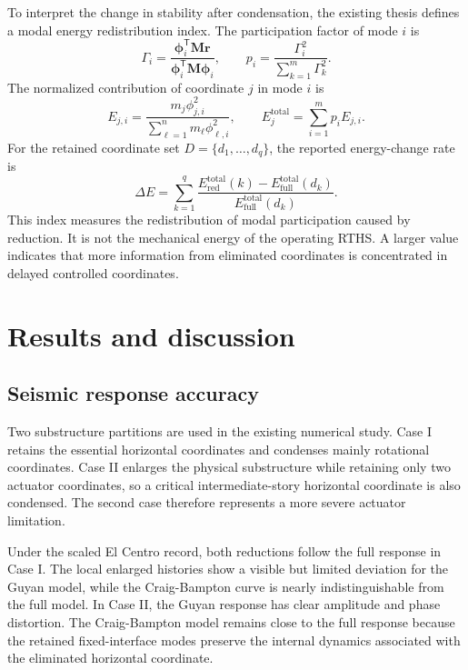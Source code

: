 \documentclass[11pt,a4paper]{article}
\newenvironment{addedblock}{\begingroup\color{addedred}}{\endgroup}
\begin{document}
\begin{addedblock}
To interpret the change in stability after condensation, the existing thesis defines a modal energy redistribution index. The participation factor of mode $i$ is
\begin{equation}
\Gamma_i=\frac{\bm\phi_i^{\mathsf T}\bm M\bm r}{\bm\phi_i^{\mathsf T}\bm M\bm\phi_i},
\qquad
p_i=\frac{\Gamma_i^2}{\sum_{k=1}^{m}\Gamma_k^2}.
\end{equation}
The normalized contribution of coordinate $j$ in mode $i$ is
\begin{equation}
E_{j,i}=\frac{m_j\phi_{j,i}^2}{\sum_{\ell=1}^{n}m_{\ell}\phi_{\ell,i}^2},
\qquad
E_j^{\mathrm{total}}=\sum_{i=1}^{m}p_iE_{j,i}.
\end{equation}
For the retained coordinate set $D=\{d_1,\ldots,d_q\}$, the reported energy-change rate is
\begin{equation}
\Delta E=\sum_{k=1}^{q}\frac{E_{\mathrm{red}}^{\mathrm{total}}(k)-E_{\mathrm{full}}^{\mathrm{total}}(d_k)}{E_{\mathrm{full}}^{\mathrm{total}}(d_k)}.
\label{eq:energyindex}
\end{equation}
This index measures the redistribution of modal participation caused by reduction. It is not the mechanical energy of the operating RTHS. A larger value indicates that more information from eliminated coordinates is concentrated in delayed controlled coordinates.
\end{addedblock}

\FloatBarrier
\section{Results and discussion}

\subsection{Seismic response accuracy}

Two substructure partitions are used in the existing numerical study. Case I retains the essential horizontal coordinates and condenses mainly rotational coordinates. Case II enlarges the physical substructure while retaining only two actuator coordinates, so a critical intermediate-story horizontal coordinate is also condensed. The second case therefore represents a more severe actuator limitation.

Under the scaled El Centro record, both reductions follow the full response in Case I. The local enlarged histories show a visible but limited deviation for the Guyan model, while the Craig-Bampton curve is nearly indistinguishable from the full model. In Case II, the Guyan response has clear amplitude and phase distortion. The Craig-Bampton model remains close to the full response because the retained fixed-interface modes preserve the internal dynamics associated with the eliminated horizontal coordinate.
\end{document}
